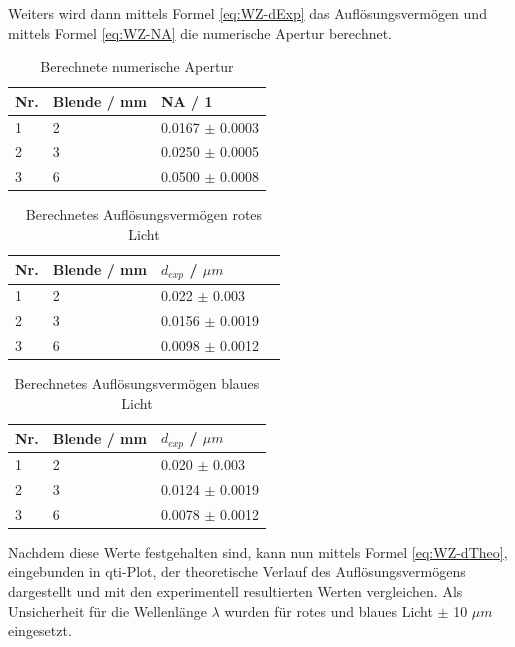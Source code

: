 \documentclass[12pt,a4paper,twoside]{article}
\begin{document}
\noindent
Weiters wird dann mittels Formel \ref{eq:WZ-dExp} das Auflösungsvermögen und mittels Formel \ref{eq:WZ-NA} die numerische Apertur berechnet.

\begin{table}[H]
    \centering
    \caption{Berechnete numerische Apertur}
    \label{tab:BerechneteNA}
    \begin{tabular}{| l | l | l |}
        \hline
        Nr. & Blende / mm & NA / 1\\
        \hline
        1 & 2 & 0.0167 $\pm$ 0.0003 \\
        2 & 3 & 0.0250 $\pm$ 0.0005 \\
        3 & 6 & 0.0500 $\pm$ 0.0008 \\
        \hline
    \end{tabular}
\end{table}

\begin{table}[H]
    \centering
    \caption{Berechnetes Auflösungsvermögen rotes Licht}
    \label{tab:BerechneteAVrot}
    \begin{tabular}{| l | l | l | l |}
        \hline
        Nr. & Blende / mm & $d_{exp}$ / $\mu m$\\
        \hline
        1 & 2 & 0.022  $\pm$ 0.003  \\
        2 & 3 & 0.0156 $\pm$ 0.0019 \\
        3 & 6 & 0.0098 $\pm$ 0.0012 \\
        \hline
    \end{tabular}
\end{table}

\begin{table}[H]
    \centering
    \caption{Berechnetes Auflösungsvermögen blaues Licht}
    \label{tab:BerechneteAVblau}
    \begin{tabular}{| l | l | l |}
        \hline
        Nr. & Blende / mm & $d_{exp}$ / $\mu m$\\
        \hline
        1 & 2 & 0.020  $\pm$ 0.003  \\
        2 & 3 & 0.0124 $\pm$ 0.0019 \\
        3 & 6 & 0.0078 $\pm$ 0.0012 \\
        \hline
    \end{tabular}
\end{table}

\noindent
Nachdem diese Werte festgehalten sind, kann nun mittels Formel \ref{eq:WZ-dTheo}, eingebunden in qti-Plot, der theoretische Verlauf des Auflösungsvermögens dargestellt und mit den experimentell resultierten Werten vergleichen.
Als Unsicherheit für die Wellenlänge $ \lambda $ wurden für rotes und blaues Licht $\pm$ 10 $\mu m$ eingesetzt.
\end{document}
